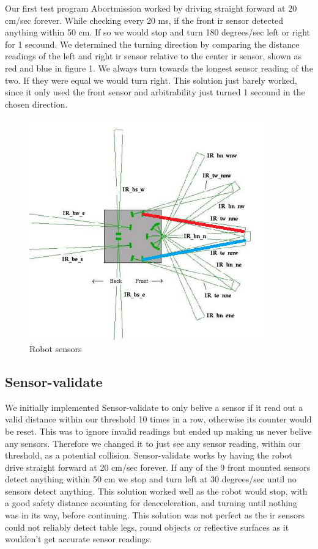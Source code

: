 \documentclass[a4paper,12pt]{article}
\begin{document}
Our first test program Abortmission worked by driving straight forward at 20 cm/sec forever. While checking every 20 ms, if the front ir sensor detected anything within 50 cm. If so we would stop and turn 180 degrees/sec left or right for 1 secound. We determined the turning direction by comparing the distance readings of the left and right ir sensor relative to the center ir sensor, shown as red and blue in figure 1. We always turn towards the longest sensor reading of the two. If they were equal we would turn right.
\newline
\newline
This solution just barely worked, since it only used the front sensor and arbitrability just turned 1 secound in the chosen direction.

\begin{figure}
\includegraphics{robot2.png}
\caption{Robot sensors}
\end{figure}

\subsection{Sensor-validate}

We initially implemented Sensor-validate to only belive a sensor if it read out a valid distance within our threshold 10 times in a row, otherwise its counter would be reset. This was to ignore invalid readings but ended up making us never belive any sensors. Therefore we changed it to just see any sensor reading, within our threshold, as a potential collision.
\newline
\newline
Sensor-validate works by having the robot drive straight forward at 20 cm/sec forever. If any of the 9 front mounted sensors detect anything within 50 cm we stop and turn left at 30 degrees/sec until no sensors detect anything. 
\newline
\newline
This solution worked well as the robot would stop, with a good safety distance acounting for deacceleration, and turning until nothing was in its way, before continuing. This solution was not perfect as the ir sensors could not reliably detect table legs, round objects or reflective surfaces as it woulden't get accurate sensor readings.
\end{document}
